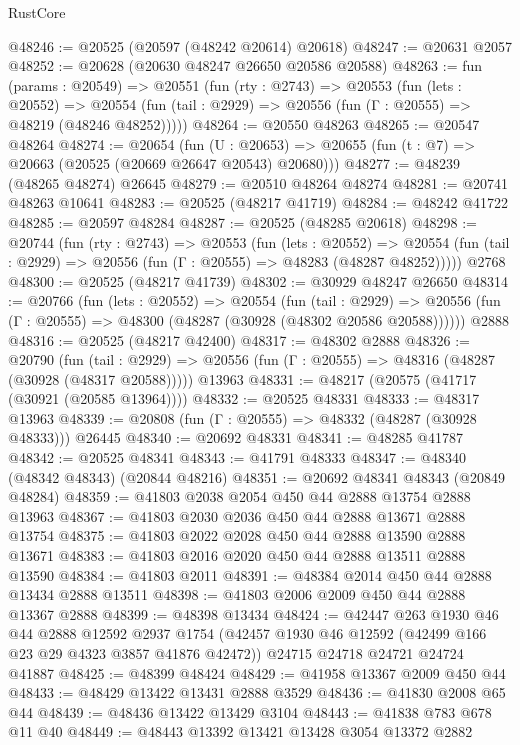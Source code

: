 \begin{lexlean}{RustCore}
\begin{coremodule}
@48246 := @20525 (@20597 (@48242 @20614) @20618)
@48247 := @20631 @2057
@48252 := @20628 (@20630 @48247 @26650 @20586 @20588)
@48263 := fun (params : @20549) =>
  @20551
    (fun (rty : @2743) =>
    @20553
      (fun (lets : @20552) =>
      @20554 (fun (tail : @2929) => @20556 (fun (Γ : @20555) => @48219 (@48246 @48252)))))
@48264 := @20550 @48263
@48265 := @20547 @48264
@48274 := @20654
    (fun (U : @20653) => @20655 (fun (t : @7) => @20663 (@20525 (@20669 @26647 @20543) @20680)))
@48277 := @48239 (@48265 @48274) @26645
@48279 := @20510 @48264 @48274
@48281 := @20741 @48263 @10641
@48283 := @20525 (@48217 @41719)
@48284 := @48242 @41722
@48285 := @20597 @48284
@48287 := @20525 (@48285 @20618)
@48298 := @20744
    (fun (rty : @2743) =>
    @20553
      (fun (lets : @20552) =>
      @20554 (fun (tail : @2929) => @20556 (fun (Γ : @20555) => @48283 (@48287 @48252)))))
    @2768
@48300 := @20525 (@48217 @41739)
@48302 := @30929 @48247 @26650
@48314 := @20766
    (fun (lets : @20552) =>
    @20554
      (fun (tail : @2929) =>
      @20556 (fun (Γ : @20555) => @48300 (@48287 (@30928 (@48302 @20586 @20588))))))
    @2888
@48316 := @20525 (@48217 @42400)
@48317 := @48302 @2888
@48326 := @20790
    (fun (tail : @2929) => @20556 (fun (Γ : @20555) => @48316 (@48287 (@30928 (@48317 @20588)))))
    @13963
@48331 := @48217 (@20575 (@41717 (@30921 (@20585 @13964))))
@48332 := @20525 @48331
@48333 := @48317 @13963
@48339 := @20808 (fun (Γ : @20555) => @48332 (@48287 (@30928 @48333))) @26445
@48340 := @20692 @48331
@48341 := @48285 @41787
@48342 := @20525 @48341
@48343 := @41791 @48333
@48347 := @48340 (@48342 @48343) (@20844 @48216)
@48351 := @20692 @48341 @48343 (@20849 @48284)
@48359 := @41803 @2038 @2054 @450 @44 @2888 @13754 @2888 @13963
@48367 := @41803 @2030 @2036 @450 @44 @2888 @13671 @2888 @13754
@48375 := @41803 @2022 @2028 @450 @44 @2888 @13590 @2888 @13671
@48383 := @41803 @2016 @2020 @450 @44 @2888 @13511 @2888 @13590
@48384 := @41803 @2011
@48391 := @48384 @2014 @450 @44 @2888 @13434 @2888 @13511
@48398 := @41803 @2006 @2009 @450 @44 @2888 @13367 @2888
@48399 := @48398 @13434
@48424 := @42447
    @263
    @1930
    @46
    @44
    @2888
    @12592
    @2937
    @1754
    (@42457 @1930 @46 @12592 (@42499 @166 @23 @29 @4323 @3857 @41876 @42472))
    @24715
    @24718
    @24721
    @24724
    @41887
@48425 := @48399 @48424
@48429 := @41958 @13367 @2009 @450 @44
@48433 := @48429 @13422 @13431 @2888 @3529
@48436 := @41830 @2008 @65 @44
@48439 := @48436 @13422 @13429 @3104
@48443 := @41838 @783 @678 @11 @40
@48449 := @48443 @13392 @13421 @13428 @3054 @13372 @2882

\end{coremodule}
\end{lexlean}
